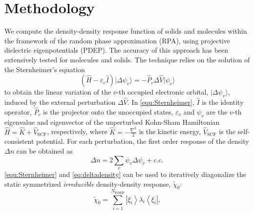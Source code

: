 \documentclass[aip,preprint]{revtex4-1}
\begin{document}
\section{\label{sec:method}Methodology}
We compute the density-density response function of solids and molecules within the framework of the random phase approximation (RPA), using  projective dielectric eigenpotentials (PDEP)\cite{wilson2008,wilson2009,Marco2015}. The accuracy of this approach has been extensively tested for molecules and solids.\cite{wilson2009} The technique relies on the solution of the Sternheimer's equation~\cite{Sternheimer1954}
\begin{equation}
    (\hat{H}-\varepsilon_v\hat{I})\lvert\Delta\psi_v\rangle = -\hat{P}_c\Delta \hat{V}\lvert\psi_v\rangle
    \label{equ:Sternheimer}
\end{equation}
to obtain the linear variation of the $v$-th occupied electronic orbital, $\lvert\Delta\psi_v\rangle$, induced by the external perturbation $\Delta \hat{V}$. In \autoref{equ:Sternheimer}, $\hat{I}$ is the identity operator, $\hat{P}_c$ is the projector onto the unoccupied states, $\varepsilon_v$ and $\psi_v$ are the $v$-th eigenvalue and eigenvector of the  unperturbed Kohn-Sham Hamiltonian $\hat{H}=\hat{K}+\hat{V}_\mathrm{SCF}$, respectively, where $\hat{K}=-\frac{\nabla^2}{2}$ is the kinetic energy, $\hat{V}_\mathrm{SCF}$ is the self-consistent potential. 
For each perturbation, the first order response of the density $\Delta n$ can be obtained as \cite{baroni2001phonons}
\begin{equation}
    \Delta n = 2 \sum_v \psi_v\Delta\psi_v +c.c. \, 
    \label{eq:deltadensity}
\end{equation}
\autoref{equ:Sternheimer} and \ref{eq:deltadensity} can be used to iteratively diagonalize the static symmetrized \textit{irreducible} density-density response, $\tilde{\chi}_0$:\cite{wilson2008,wilson2009,Marco2015}
\begin{equation}
    \tilde{\chi}_0 = \sum_{i=1}^{N_\mathrm{PDEP}}\left|\xi_i\right\rangle\lambda_i\left\langle\xi_i\right|,\label{equ:chi0}
\end{equation}
\end{document}
